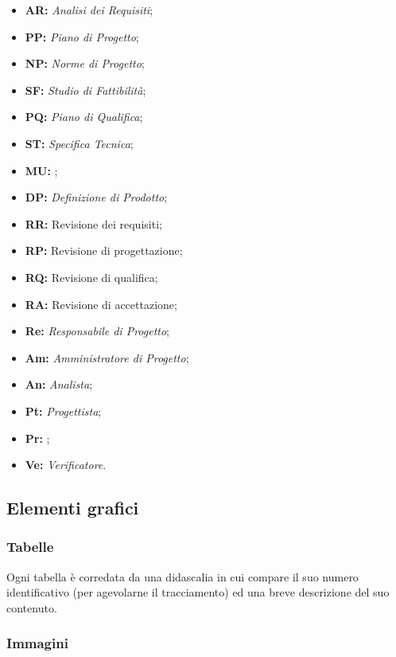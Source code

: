\documentclass[../NormediProgetto.tex]{subfiles}
\begin{document}
\begin{itemize}
	\item{\textbf{AR:}} \textit{Analisi dei Requisiti};
	\item{\textbf{PP:}} \textit{Piano di Progetto};
	\item{\textbf{NP:}} \textit{Norme di Progetto};
	\item{\textbf{SF:}} \textit{Studio di Fattibilità};
	\item{\textbf{PQ:}} \textit{Piano di Qualifica};
	\item{\textbf{ST:}} \textit{Specifica Tecnica};
	\item{\textbf{MU:}} ;
	\item{\textbf{DP:}} \textit{Definizione di Prodotto};
	\item{\textbf{RR:}} Revisione dei requisiti;
	\item{\textbf{RP:}} Revisione di progettazione;
	\item{\textbf{RQ:}} Revisione di qualifica;
	\item{\textbf{RA:}} Revisione di accettazione;
	\item{\textbf{Re:}} \textit{Responsabile di Progetto};
	\item{\textbf{Am:}} \textit{Amministratore di Progetto};
	\item{\textbf{An:}} \textit{Analista};
	\item{\textbf{Pt:}} \textit{Progettista};
	\item{\textbf{Pr:}} ;
	\item{\textbf{Ve:}} \textit{Verificatore}.
\end{itemize}

\subsection{Elementi grafici}

\subsubsection{Tabelle}

Ogni tabella è corredata da una didascalia in cui compare il suo numero identificativo (per agevolarne il tracciamento) ed una breve descrizione del suo contenuto.

\subsubsection{Immagini}
\end{document}
